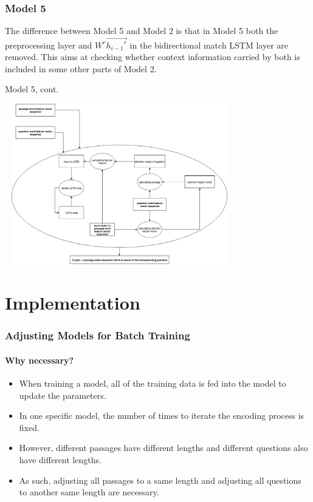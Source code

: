 \documentclass{beamer}
\begin{document}
\begin{frame} \frametitle{Model 5}
    The difference between Model 5 and Model 2 is that in Model 5 both the preprocessing layer and $W^r\overrightarrow{{h_{i-1}}^r}$ in the bidirectional match LSTM layer are removed. This aims at checking whether context information carried by both is included in some other parts of Model 2.
\end{frame}


\begin{frame}{Model 5, cont.}
    \begin{center}
        \includegraphics[width=10cm, height=7cm]{figures/model5_encoder.png}
    \end{center}
\end{frame}

\section{Implementation}

\begin{frame} \frametitle{Adjusting Models for Batch Training}\framesubtitle{Why necessary?}
    \begin{itemize}
        \item When training a model, all of the training data is fed into the model to update the parameters.
        \item In one specific model, the number of times to iterate the encoding process is fixed.
        \item However, different passages have different lengths and different questions also have different lengths.
        \item As such, adjusting all passages to a same length and adjusting all questions to another same length are necessary.
    \end{itemize}
\end{frame}
\end{document}
